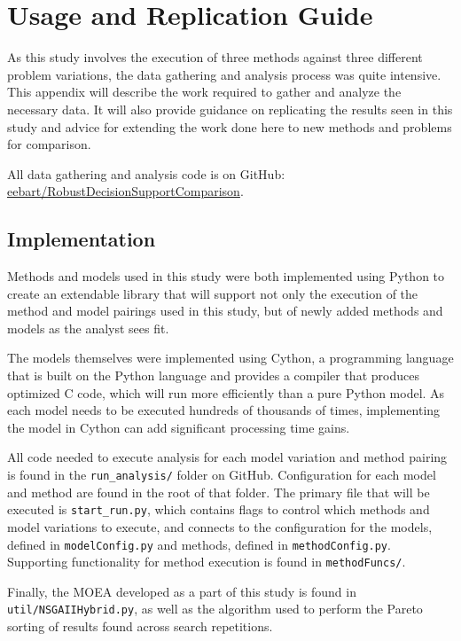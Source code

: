 \chapter{Usage and Replication Guide}
\label{appendix-code}

As this study involves the execution of three methods against three different problem variations, the data gathering and analysis process was quite intensive. This appendix will describe the work required to gather and analyze the necessary data. It will also provide guidance on replicating the results seen in this study and advice for extending the work done here to new methods and problems for comparison. 

All data gathering and analysis code is on GitHub: \href{https://github.com/eebart/RobustDecisionSupportComparison}{eebart/RobustDecisionSupportComparison}. 

\section{Implementation}
Methods and models used in this study were both implemented using Python to create an extendable library that will support not only the execution of the method and model pairings used in this study, but of newly added methods and models as the analyst sees fit. 

The models themselves were implemented using Cython, a programming language that is built on the Python language and provides a compiler that produces optimized C code, which will run more efficiently than a pure Python model. As each model needs to be executed hundreds of thousands of times, implementing the model in Cython can add significant processing time gains. 

All code needed to execute analysis for each model variation and method pairing is found in the \texttt{run_analysis/} folder on GitHub. Configuration for each model and method are found in the root of that folder. The primary file that will be executed is \texttt{start_run.py}, which contains flags to control which methods and model variations to execute, and connects to the configuration for the models, defined in \texttt{modelConfig.py} and methods, defined in \texttt{methodConfig.py}. Supporting functionality for method execution is found in \texttt{methodFuncs/}. 

Finally, the MOEA developed as a part of this study is found in \texttt{util/NSGAIIHybrid.py}, as well as the algorithm used to perform the Pareto sorting of results found across search repetitions. 


